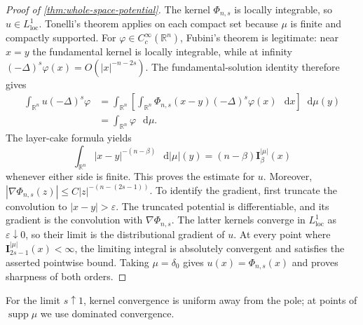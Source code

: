 \documentclass[10pt,a4paper]{amsart}
\numberwithin{equation}{section}
\newcommand{\R}{\mathbb R}
\newcommand{\I}{\mathbf I}
\newcommand{\differential}{\mathop{}\!\mathrm d}
\newcommand{\rev}[1]{#1}
\begin{document}
\begin{proof}[Proof of \cref{thm:whole-space-potential}]
\begingroup
The kernel $\Phi_{n,s}$ is locally integrable, so $u\in L^1_{\mathrm{loc}}$.
Tonelli's theorem applies on each compact set because
$\mu$ is finite and compactly supported.  For
$\varphi\in C_c^\infty(\R^n)$, Fubini's theorem is legitimate: near
$x=y$ the fundamental kernel is locally integrable, while at infinity
$(-\Delta)^s\varphi(x)=O(|x|^{-n-2s})$.  The fundamental-solution identity
therefore gives
\begin{align*}
 \int_{\R^n}u(-\Delta)^s\varphi
 &=\int_{\R^n}\!\left[\int_{\R^n}
 \Phi_{n,s}(x-y)(-\Delta)^s\varphi(x)\,\differential x\right]
 \differential\mu(y)\\
 &=\int_{\R^n}\varphi\,\differential\mu.
\end{align*}
The layer-cake formula yields
\[
 \int_{\R^n}|x-y|^{-(n-\beta)}\,\differential|\mu|(y)
 =(n-\beta)\I_\beta^{|\mu|}(x)
\]
whenever either side is finite.  This proves the estimate for $u$.  Moreover,
$|\nabla\Phi_{n,s}(z)|\le C|z|^{-(n-(2s-1))}$.  To identify the gradient,
first truncate the convolution to $|x-y|>\varepsilon$.  The truncated
potential is differentiable, and its gradient is the convolution with
$\nabla\Phi_{n,s}$.  The latter kernels converge in
$L^1_{\mathrm{loc}}$ as $\varepsilon\downarrow0$, so their limit is the
distributional gradient of $u$.  At every point where
$\I_{2s-1}^{|\mu|}(x)<\infty$, the limiting integral is absolutely
convergent and satisfies the asserted pointwise bound.  Taking
$\mu=\delta_0$ gives $u(x)=\Phi_{n,s}(x)$ and proves sharpness of both
orders.
\endgroup
\end{proof}

\rev{For the limit $s\uparrow1$, kernel convergence is uniform away from
the pole; at points of $\operatorname{supp}\mu$ we use dominated
convergence.}
\end{document}
